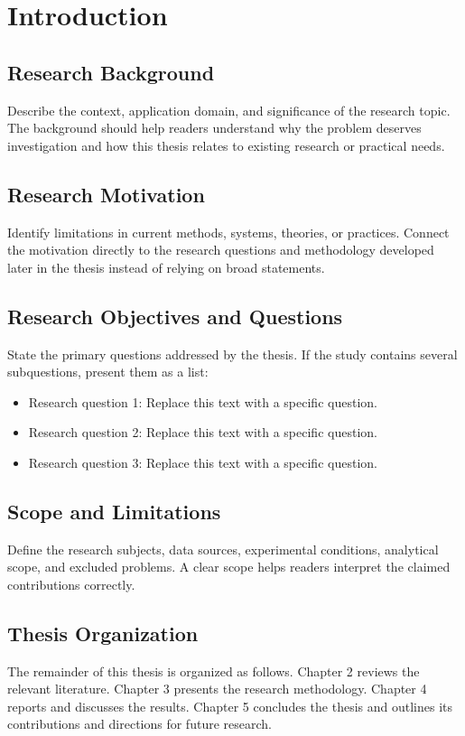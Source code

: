 \chapter{Introduction}

\section{Research Background}

Describe the context, application domain, and significance of the research topic. The background should help readers understand why the problem deserves investigation and how this thesis relates to existing research or practical needs.

\section{Research Motivation}

Identify limitations in current methods, systems, theories, or practices. Connect the motivation directly to the research questions and methodology developed later in the thesis instead of relying on broad statements.

\section{Research Objectives and Questions}

State the primary questions addressed by the thesis. If the study contains several subquestions, present them as a list:

\begin{itemize}
  \item Research question 1: Replace this text with a specific question.
  \item Research question 2: Replace this text with a specific question.
  \item Research question 3: Replace this text with a specific question.
\end{itemize}

\section{Scope and Limitations}

Define the research subjects, data sources, experimental conditions, analytical scope, and excluded problems. A clear scope helps readers interpret the claimed contributions correctly.

\section{Thesis Organization}

The remainder of this thesis is organized as follows. Chapter 2 reviews the relevant literature. Chapter 3 presents the research methodology. Chapter 4 reports and discusses the results. Chapter 5 concludes the thesis and outlines its contributions and directions for future research.
